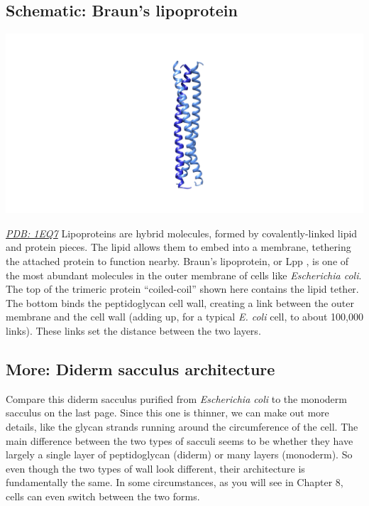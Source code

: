 \documentclass[]{tufte-book}
\begin{document}
\hypertarget{Brauns_lipoprotein}{%
\subsection*{Schematic: Braun's lipoprotein}\label{Brauns_lipoprotein}}

\includegraphics{img/schematics/2_3_1}

\href{http://rcsb.org/structure/1EQ7}{\emph{PDB: 1EQ7}}
Lipoproteins are hybrid molecules, formed by covalently-linked lipid and protein pieces. The lipid allows them to embed into a membrane, tethering the attached protein to function nearby. Braun's lipoprotein, or Lpp \citep{shu2000}, is one of the most abundant molecules in the outer membrane of cells like \emph{Escherichia coli}. The top of the trimeric protein ``coiled-coil'' shown here contains the lipid tether. The bottom binds the peptidoglycan cell wall, creating a link between the outer membrane and the cell wall (adding up, for a typical \emph{E. coli} cell, to about 100,000 links). These links set the distance between the two layers.

\hypertarget{Diderm_sacculus_architecture}{%
\subsection*{More: Diderm sacculus architecture}\label{Diderm_sacculus_architecture}}

Compare this diderm sacculus purified from \emph{Escherichia coli} to the monoderm sacculus on the last page. Since this one is thinner, we can make out more details, like the glycan strands running around the circumference of the cell. The main difference between the two types of sacculi seems to be whether they have largely a single layer of peptidoglycan (diderm) or many layers (monoderm). So even though the two types of wall look different, their architecture is fundamentally the same. In some circumstances, as you will see in Chapter 8, cells can even switch between the two forms.
\end{document}
